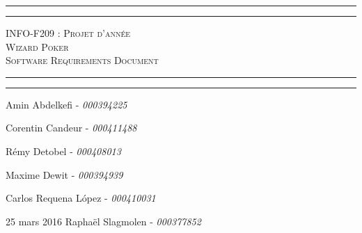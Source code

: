 \begin{titlepage}

\begin{center}
    \vspace*{\fill}
        \hrule
        \vspace*{2pt}
        \hrule
        \vspace*{15pt}
        \textsc{\Huge{INFO-F209 : Projet d'année \\\vspace*{8pt}
            Wizard Poker\\\vspace*{12pt}
            Software Requirements Document}}
        \vspace*{15pt}
        \hrule
        \vspace*{2pt}
        \hrule
  \vspace*{\fill}
\end{center}
\null
\vfill

\large
\hfill Amin Abdelkefi - \emph{000394225}

\hfill Corentin Candeur - \emph{000411488}

\hfill Rémy Detobel - \emph{000408013}

\hfill Maxime Dewit - \emph{000394939}

\hfill Carlos Requena López - \emph{000410031}

25 mars 2016 \hfill Raphaël Slagmolen - \emph{000377852}


\end{titlepage}
